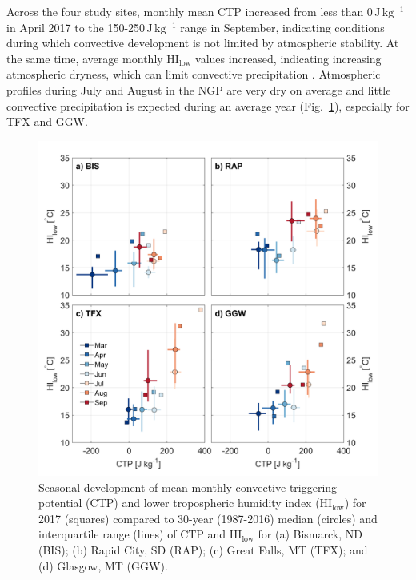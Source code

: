 \documentclass[hess, manuscript]{copernicus}
\begin{document}
Across the four study sites, monthly mean CTP increased from less than 0\,$\mathrm{J\,kg^{-1}}$ in April 2017 to the 150-250\,$\mathrm{J\,kg^{-1}}$ range in September, indicating conditions during which convective development is not limited by atmospheric stability. At the same time, average monthly $\mathrm{HI_{low}}$ values increased, indicating increasing atmospheric dryness, which can limit convective precipitation \citep{Findell_2003a, Findell_2003b}. Atmospheric profiles during July and August in the NGP are very dry on average and little convective precipitation is expected during an average year (Fig.~\ref{Fig:3}), especially for TFX and GGW. 
%
\begin{figure}[t]
\includegraphics[width=12cm]{./Figures/CTP_HIlow.png}
\caption{Seasonal development of mean monthly convective triggering potential (CTP) and lower tropospheric humidity index ($\mathrm{HI_{low}}$) for 2017 (squares) compared to 30-year (1987-2016) median (circles) and interquartile range (lines) of CTP and $\mathrm{HI_{low}}$ for (a) Bismarck, ND (BIS); (b) Rapid City, SD (RAP); (c) Great Falls, MT (TFX); and (d) Glasgow, MT (GGW).}\label{Fig:3}
\end{figure}
\end{document}
